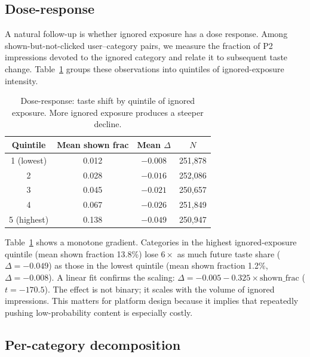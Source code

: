\documentclass[11pt]{article}
\begin{document}
\subsection{Dose-response}

A natural follow-up is whether ignored exposure has a dose response. Among shown-but-not-clicked user--category pairs, we measure the fraction of P2 impressions devoted to the ignored category and relate it to subsequent taste change. Table~\ref{tab:doseresponse} groups these observations into quintiles of ignored-exposure intensity.
\begin{table}[ht]
\centering
\caption{Dose-response: taste shift by quintile of ignored exposure. More ignored exposure produces a steeper decline.}
\label{tab:doseresponse}
\begin{tabular}{cccc}
\toprule
Quintile & Mean shown frac & Mean $\Delta$ & $N$ \\
\midrule
1 (lowest) & 0.012 & $-0.008$ & 251,878 \\
2 & 0.028 & $-0.016$ & 252,086 \\
3 & 0.045 & $-0.021$ & 250,657 \\
4 & 0.067 & $-0.026$ & 251,849 \\
5 (highest) & 0.138 & $\mathbf{-0.049}$ & 250,947 \\
\bottomrule
\end{tabular}
\end{table}
\FloatBarrier

Table~\ref{tab:doseresponse} shows a monotone gradient. Categories in the highest ignored-exposure quintile (mean shown fraction 13.8\%) lose $6\times$ as much future taste share ($\Delta = -0.049$) as those in the lowest quintile (mean shown fraction 1.2\%, $\Delta = -0.008$). A linear fit confirms the scaling: $\Delta = -0.005 - 0.325 \times \text{shown\_frac}$ ($t = -170.5$). The effect is not binary; it scales with the volume of ignored impressions. This matters for platform design because it implies that repeatedly pushing low-probability content is especially costly.
\subsection{Per-category decomposition}
\end{document}
